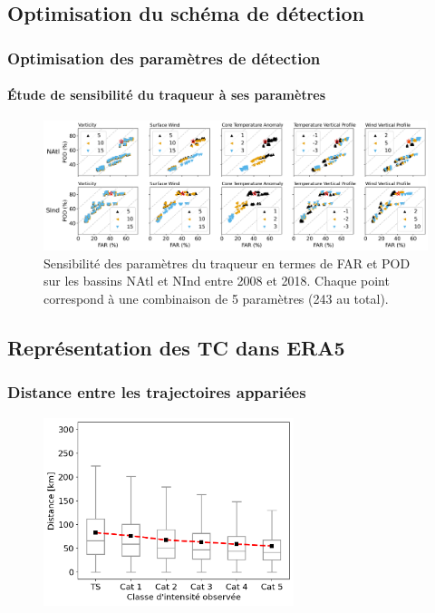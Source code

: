 \documentclass[aspectratio=169, usepdftitle=false, xcolor={dvipsnames}, 9pt,table]{beamer}
\begin{document}
\subsection*{Optimisation du schéma de détection}

\begin{frame}[c]
    \frametitle{Optimisation des paramètres de détection}
    \framesubtitle{Étude de sensibilité du traqueur à ses paramètres}
    \begin{figure}
        \centering
        \includegraphics[width=\textwidth]{Figures/optimisation_vectors.png}
        \caption{\small Sensibilité des paramètres du traqueur en termes de FAR et POD sur les bassins NAtl et NInd entre 2008 et 2018. Chaque point correspond
        à une combinaison de 5 paramètres (243 au total).}
    \end{figure}
\end{frame}

\subsection*{Représentation des TC dans ERA5}

\begin{frame}[c]
    \frametitle{Distance entre les trajectoires appariées}
    \begin{figure}
        \centering
        \includegraphics[width=0.65\textwidth]{Figures/Annexes/distances_match.png}
    \end{figure}
\end{frame}
\end{document}
